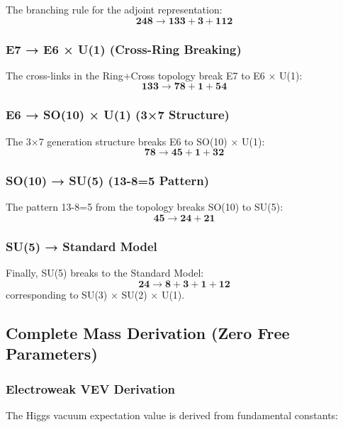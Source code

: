 \documentclass[12pt,a4paper]{article}
\begin{document}
The branching rule for the adjoint representation:
\begin{equation}
\mathbf{248} \rightarrow \mathbf{133} + \mathbf{3} + \mathbf{112}
\end{equation}

\subsubsection{E7 → E6 × U(1) (Cross-Ring Breaking)}
The cross-links in the Ring+Cross topology break E7 to E6 × U(1):
\begin{equation}
\mathbf{133} \rightarrow \mathbf{78} + \mathbf{1} + \mathbf{54}
\end{equation}

\subsubsection{E6 → SO(10) × U(1) (3×7 Structure)}
The 3×7 generation structure breaks E6 to SO(10) × U(1):
\begin{equation}
\mathbf{78} \rightarrow \mathbf{45} + \mathbf{1} + \mathbf{32}
\end{equation}

\subsubsection{SO(10) → SU(5) (13-8=5 Pattern)}
The pattern 13-8=5 from the topology breaks SO(10) to SU(5):
\begin{equation}
\mathbf{45} \rightarrow \mathbf{24} + \mathbf{21}
\end{equation}

\subsubsection{SU(5) → Standard Model}
Finally, SU(5) breaks to the Standard Model:
\begin{equation}
\mathbf{24} \rightarrow \mathbf{8} + \mathbf{3} + \mathbf{1} + \mathbf{12}
\end{equation}
corresponding to SU(3) × SU(2) × U(1).

\subsection{Complete Mass Derivation (Zero Free Parameters)}

\subsubsection{Electroweak VEV Derivation}
The Higgs vacuum expectation value is derived from fundamental constants:
\end{document}
